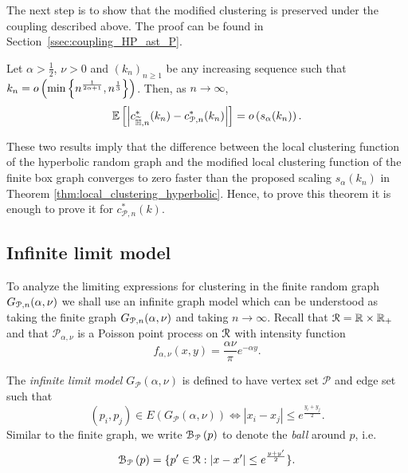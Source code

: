 The next step is to show that the modified clustering is preserved under the coupling described above. The proof can be found in Section~\ref{ssec:coupling_HP_ast_P}.

\begin{proposition}\label{prop:couling_c_H_P}
Let $\alpha > \frac{1}{2}$, $\nu > 0$ and $(k_n)_{n\ge 1}$ be any increasing sequence such that $k_n = o\left(\min\left\{n^{\frac{1}{2\alpha + 1}}, n^{\frac{1}{3}}\right\}\right)$. Then, as $n \to \infty$,
\[
	\mathbb{E}\left[\left|c_{\widetilde{\mathbb{H}},n}^\ast(k_n) - c_{{\mathcal P},n}^\ast(k_n)\right|\right] = o\left(s_\alpha(k_n)\right).
\]
\end{proposition}

These two results imply that the difference between the local clustering function of the hyperbolic random graph and the modified local clustering function of the finite box graph converges to zero faster than the proposed scaling $s_\alpha(k_n)$ in Theorem \ref{thm:local_clustering_hyperbolic}. Hence, to prove this theorem it is enough to prove it for $c_{\mathcal{P},n}^\ast(k)$. 

\subsection{Infinite limit model}\label{ssec:infinite_model}

To analyze the limiting expressions for clustering in the finite random graph $G_{{\mathcal P},n}(\alpha, \nu)$ we shall use an infinite graph model which can be understood as taking the finite graph $G_{{\mathcal P},n}(\alpha,\nu)$ and taking $n \to \infty$. Recall that ${\mathcal R} = \mathbb{R} \times \mathbb{R}_+$ and that $\mathcal{P}_{\alpha,\nu}$ is a Poisson point process on ${\mathcal R}$ with intensity function
\[
	f_{\alpha,\nu}(x,y) = \frac{\alpha \nu}{\pi} e^{-\alpha y}.
\]

The \emph{infinite limit model} $G_{\mathcal{P}}(\alpha, \nu)$ is defined to have vertex set $\mathcal{P}$ and edge set such that
\[
	(p_i, p_j) \in E(G_{\mathcal{P}}(\alpha, \nu)) \iff |x_i - x_j| \leq e^{\frac{y_i + y_j}{2}}.
\]
Similar to the finite graph, we write ${\mathcal B}_{{\mathcal P}}\left(p\right)$ to denote the \emph{ball} around $p$, i.e.
\begin{equation}\label{eq:def_ball_P}
	{\mathcal B}_{{\mathcal P}}\left(p\right) = \{p^\prime \in {\mathcal R} : |x - x^\prime| \leq e^{\frac{y + y^\prime}{2}}\}.
\end{equation}

